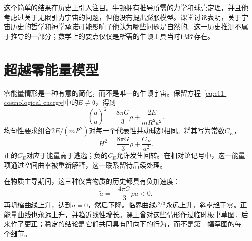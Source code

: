 \begin{classroomqa}
\end{classroomqa}

这个简单的结果在历史上引人注目。牛顿拥有推导所需的力学和球壳定理，并且他考虑过关于无限引力宇宙的问题，但他没有提出膨胀模型。课堂讨论表明，关于宇宙历史的哲学和神学承诺可能影响了他认为哪些问题是自然的。这一历史推测不属于推导的一部分；数学上的要点仅仅是所需的牛顿工具当时已经存在。

\begin{classroomqa}
\end{classroomqa}

\section{超越零能量模型}

零能量情形是一种有意的简化，而不是唯一的牛顿宇宙。保留方程~\eqref{eq:c01-cosmological-energy}中的\(E\neq0\)，得到
\begin{equation}
\left(\frac{\dot a}{a}\right)^2
=\frac{8\pi G}{3}\rho+\frac{2E}{mR^2a^2}.
\label{eq:c01-nonzero-energy}
\end{equation}
均匀性要求组合\(2E/(mR^2)\)对每一个代表性共动球都相同。将其写为常数\(C_E\)，
\begin{equation}
H^2=\frac{8\pi G}{3}\rho+\frac{C_E}{a^2}.
\end{equation}
正的\(C_E\)对应于能量高于逃逸；负的\(C_E\)允许发生回转。在相对论记号中，这一能量项通过空间曲率被重新解释，这一联系留待后续处理。

在物质主导期间，这三种仅含物质的历史都具有负加速度：
\begin{equation}
\ddot a=-\frac{4\pi G}{3}\rho a<0.
\end{equation}
再坍缩曲线上升，达到\(\dot a=0\)，然后下降。临界曲线\(t^{2/3}\)永远上升，斜率趋于零。正能量曲线也永远上升，并趋近线性增长。课上曾对这些情形作过临时板书草图，后来作了更正；稳定的结论是它们共同具有凹向下的行为，而不是第一幅草图的每一个细节。

